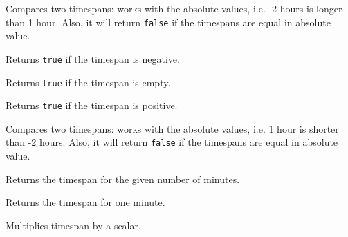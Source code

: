 
Compares two timespans: works with the absolute values, i.e. -2
hours is longer than 1 hour. Also, it will return {\tt false} if
the timespans are equal in absolute value.


\label{wxtimespanisnegative}


Returns {\tt true} if the timespan is negative.


\label{wxtimespanisnull}


Returns {\tt true} if the timespan is empty.


\label{wxtimespanispositive}


Returns {\tt true} if the timespan is positive.


\label{wxtimespanisshorterthan}


Compares two timespans: works with the absolute values, i.e. 1
hour is shorter than -2 hours. Also, it will return {\tt false} if
the timespans are equal in absolute value.


\label{wxtimespanminutes}


Returns the timespan for the given number of minutes.


\label{wxtimespanminute}


Returns the timespan for one minute.


\label{wxtimespanmultiply}




Multiplies timespan by a scalar.


\label{wxtimespannegate}

